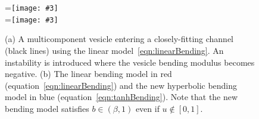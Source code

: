 \documentclass[twoside,twocolumn,9pt]{article}
\newcommand{\subfigimg}[3][,]{%
  \setbox1=\hbox{\texttt{[image: \#3]}}%
  \leavevmode\rlap{\usebox1}%
  \rlap{\hspace*{0pt}\raisebox{\dimexpr\ht1-0\baselineskip}{\bf
  \normalsize #2}}%
  \phantom{\usebox1}%
}
\begin{document}
\begin{figure}[h]
  \centering
  \subfigimg[width=0.9\linewidth, clip ]{(a)}{figures/OldBending.pdf} \\
  \subfigimg[width=0.9\linewidth, clip ]{(b)}{figures/concModels.pdf}
  \caption{\label{fig:concModels} \small (a) A multicomponent vesicle
  entering a closely-fitting channel (black lines) using the linear
  model~\eqref{eqn:linearBending}. An instability is introduced where
  the vesicle bending modulus becomes negative. (b) The linear bending
  model in red (equation~\eqref{eqn:linearBending}) and the new
  hyperbolic bending model in blue (equation~\eqref{eqn:tanhBending}).
  Note that the new bending model satisfies $b \in (\beta,1)$ even if $u
  \notin [0,1]$.}
\end{figure}





\end{document}
